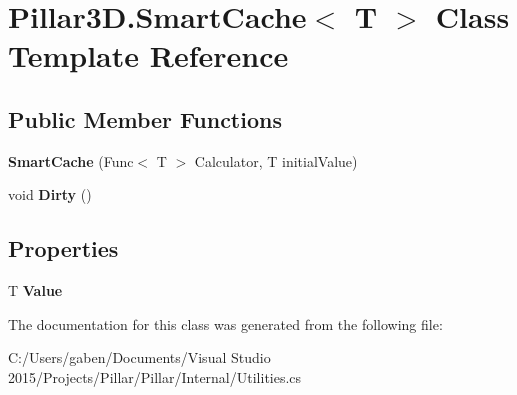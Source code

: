\hypertarget{class_pillar3_d_1_1_smart_cache}{}\section{Pillar3\+D.\+Smart\+Cache$<$ T $>$ Class Template Reference}
\label{class_pillar3_d_1_1_smart_cache}
\subsection*{Public Member Functions}
\begin{DoxyCompactItemize}
\item 
\mbox{\label{class_pillar3_d_1_1_smart_cache_aa429f916ecf2c31615adbb209f00e5f6}} 
{\bfseries Smart\+Cache} (Func$<$ T $>$ Calculator, T initial\+Value)
\item 
\mbox{\label{class_pillar3_d_1_1_smart_cache_af86e2b3e94b309d76cfcc3ba9c8250b6}} 
void {\bfseries Dirty} ()
\end{DoxyCompactItemize}
\subsection*{Properties}
\begin{DoxyCompactItemize}
\item 
\mbox{\label{class_pillar3_d_1_1_smart_cache_a5bc41dc327077e56feb07d08a045659f}} 
T {\bfseries Value}
\end{DoxyCompactItemize}


The documentation for this class was generated from the following file\+:\begin{DoxyCompactItemize}
\item 
C\+:/\+Users/gaben/\+Documents/\+Visual Studio 2015/\+Projects/\+Pillar/\+Pillar/\+Internal/Utilities.\+cs\end{DoxyCompactItemize}
